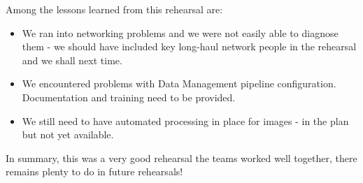 Among the lessons learned from this rehearsal are:
\begin{itemize}
\item We ran into networking problems and we were not easily able to diagnose them - we should have included key
long-haul network people in the rehearsal and we shall next time.

\item We encountered problems with Data Management pipeline configuration. Documentation and training need to be provided.

\item We still need to have automated processing in place for images - in the plan but not yet available.
\end{itemize}

In summary, this was a very good rehearsal the teams worked well together, there remains plenty to do in future rehearsals!





